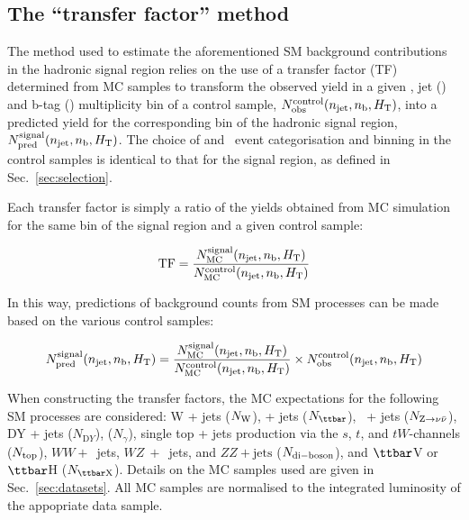 \subsection{The ``transfer factor'' method}
\label{sec:ewk-method}

The method used to estimate the aforementioned SM background
contributions in the hadronic signal region relies on the use of a
transfer factor (TF) determined from MC samples to transform the
observed yield in a given \scalht, jet (\njet) and b-tag (\nb)
multiplicity bin of a control sample, $\nobs^{\rm
  control}(\njet,\nb,\scalht)$, into a predicted yield for the
corresponding bin of the hadronic signal region, $\npre^{\rm
  signal}(\njet,\nb,\scalht)$. The choice of \njet and \nb~event
categorisation and \scalht binning in the control samples is identical
to that for the signal region, as defined in
Sec.~\ref{sec:selection}. 

Each transfer factor is simply a ratio of the yields obtained from MC
simulation for the same bin of the signal region and a given control
sample:

\begin{equation}
  \label{equ:tf-ratio}
  {\rm TF} = \frac{N_{\rm MC}^{\rm signal}(\njet,\nb,\scalht)}{N_{\rm
      MC}^{\rm control}(\njet,\nb,\scalht)} 
\end{equation}

In this way, predictions of background counts from SM processes can be
made based on the various control samples:

\begin{equation}
  \label{equ:pred-method}
  \npre^{\rm signal}(\njet,\nb,\scalht) = \frac{N_{\rm MC}^{\rm
      signal}(\njet,\nb,\scalht)}{N_{\rm MC}^{\rm
      control}(\njet,\nb,\scalht)} \times \nobs^{\rm
    control}(\njet,\nb,\scalht)   
\end{equation}

When constructing the transfer factors, the MC expectations for the
following SM processes are considered: W + jets ($N_{\rm W}$), \ttbar
+ jets ($N_{\ttbar}$), \znunu\ + jets ($N_{\znunu}$), DY + jets
($N_{\mathrm DY}$), \gj ($N_\gamma$), single top + jets
production via the $s$, $t$, and $tW$-channels ($N_{\rm top}$), $WW+$~jets, $WZ~+$~jets, and $ZZ + \textrm{jets}$ ($N_{\rm di-boson}$), and $\ttbar$V or
$\ttbar$H ($N_{\rm {\ttbar}X}$). Details on the MC
samples used are given in Sec.~\ref{sec:datasets}. All MC samples
are normalised to the integrated luminosity of the appopriate data
sample.

